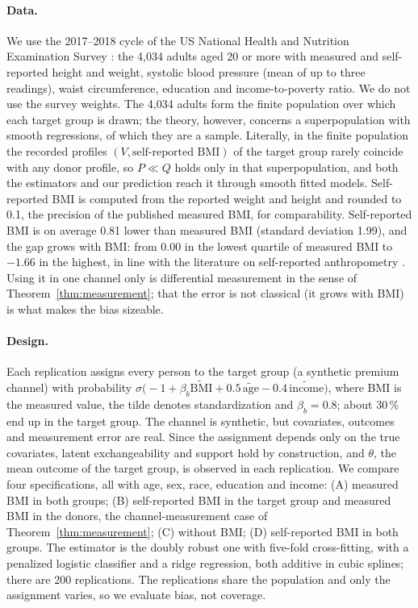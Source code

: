 \documentclass[11pt,a4paper]{article}
\theoremstyle{plain}
\theoremstyle{definition}
\begin{document}
\paragraph{Data.} We use the 2017--2018 cycle of the US National Health and Nutrition Examination Survey \citep{nchs2020}: the 4{,}034 adults aged 20 or more with measured and self-reported height and weight, systolic blood pressure (mean of up to three readings), waist circumference, education and income-to-poverty ratio. We do not use the survey weights. The 4{,}034 adults form the finite population over which each target group is drawn; the theory, however, concerns a superpopulation with smooth regressions, of which they are a sample. Literally, in the finite population the recorded profiles $(V,\text{self-reported BMI})$ of the target group rarely coincide with any donor profile, so $P\ll Q$ holds only in that superpopulation, and both the estimators and our prediction reach it through smooth fitted models. Self-reported BMI is computed from the reported weight and height and rounded to 0.1, the precision of the published measured BMI, for comparability. Self-reported BMI is on average 0.81 lower than measured BMI (standard deviation 1.99), and the gap grows with BMI: from 0.00 in the lowest quartile of measured BMI to $-1.66$ in the highest, in line with the literature on self-reported anthropometry \citep{connorgorber2007}. Using it in one channel only is differential measurement in the sense of Theorem~\ref{thm:measurement}; that the error is not classical (it grows with BMI) is what makes the bias sizeable.

\paragraph{Design.} Each replication assigns every person to the target group (a synthetic premium channel) with probability $\sigma\bigl(-1+\beta_b \tilde{\mathrm{BMI}}+0.5\,\tilde{\mathrm{age}}-0.4\,\tilde{\mathrm{income}}\bigr)$, where BMI is the measured value, the tilde denotes standardization and $\beta_b=0.8$; about 30\,\% end up in the target group. The channel is synthetic, but covariates, outcomes and measurement error are real. Since the assignment depends only on the true covariates, latent exchangeability and support hold by construction, and $\theta$, the mean outcome of the target group, is observed in each replication. We compare four specifications, all with age, sex, race, education and income: (A) measured BMI in both groups; (B) self-reported BMI in the target group and measured BMI in the donors, the channel-measurement case of Theorem~\ref{thm:measurement}; (C) without BMI; (D) self-reported BMI in both groups. The estimator is the doubly robust one with five-fold cross-fitting, with a penalized logistic classifier and a ridge regression, both additive in cubic splines; there are 200 replications. The replications share the population and only the assignment varies, so we evaluate bias, not coverage.
\end{document}
